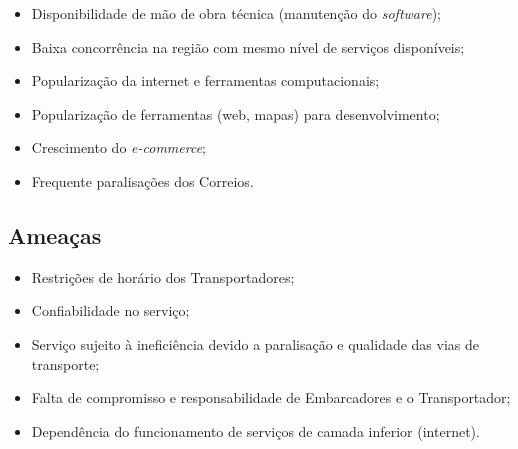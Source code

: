 		\begin{itemize}
			
			\item Disponibilidade de mão de obra técnica (manutenção do	\textit{software});
			
			\item Baixa concorrência na região com mesmo nível de serviços disponíveis;
			
			\item Popularização da internet e ferramentas computacionais;
			
			\item Popularização de ferramentas (web, mapas) para desenvolvimento;
			
			\item Crescimento do \textit{e-commerce};
			
			\item Frequente paralisações dos Correios.
			
		\end{itemize}
		
	\subsection{Ameaças}
	
		\begin{itemize}
			
			\item Restrições de horário dos Transportadores;
			
			\item Confiabilidade no serviço;
			
			\item Serviço sujeito à ineficiência devido a paralisação e qualidade das vias de transporte;
			
			\item Falta de compromisso e responsabilidade de Embarcadores e o Transportador;
			
			\item Dependência do funcionamento de serviços de camada inferior (internet).
			
		\end{itemize}
	
